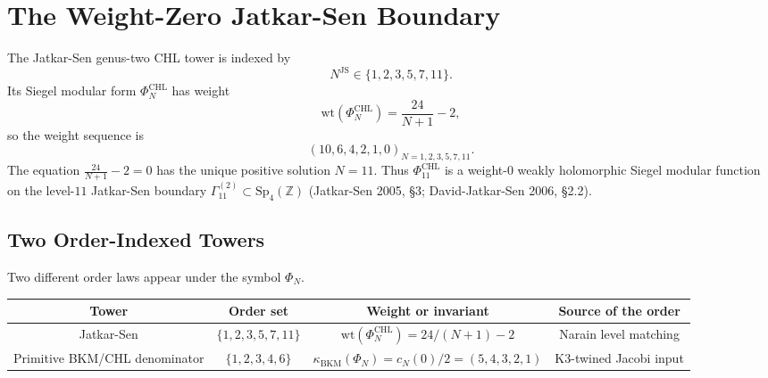 \providecommand{\GSp}{\mathrm{GSp}}
\providecommand{\Sp}{\mathrm{Sp}}
\providecommand{\Mp}{\mathrm{Mp}}
\providecommand{\Oo}{\mathrm{O}}
\providecommand{\PGSp}{\mathrm{PGSp}}
\providecommand{\SL}{\mathrm{SL}}
\providecommand{\A}{\mathbb{A}}
\providecommand{\Q}{\mathbb{Q}}
\providecommand{\Z}{\mathbb{Z}}
\providecommand{\C}{\mathbb{C}}
\providecommand{\BKM}{\mathrm{BKM}}
\providecommand{\Heis}{\mathrm{Heis}}
\providecommand{\VOA}{\mathrm{VOA}}
\providecommand{\kBKM}{\kappa_{\mathrm{BKM}}}
\providecommand{\kch}{\kappa_{\mathrm{ch}}}
\providecommand{\kcat}{\kappa_{\mathrm{cat}}}
\providecommand{\kfib}{\kappa_{\mathrm{fiber}}}
\providecommand{\cA}{\mathcal{A}}
\providecommand{\fh}{\mathfrak{h}}
\providecommand{\fm}{\mathfrak{m}}
\providecommand{\Mwh}{M^{!}}
\providecommand{\PhiCHL}{\Phi^{\mathrm{CHL}}}

\section{The Weight-Zero Jatkar-Sen Boundary}
\label{wn:sec:quadfurcation-cosmo}

The Jatkar-Sen genus-two CHL tower is indexed by
\[
  N^{\mathrm{JS}}\in\{1,2,3,5,7,11\}.
\]
Its Siegel modular form $\PhiCHL_N$ has weight
\[
  \mathrm{wt}(\PhiCHL_N)=\frac{24}{N+1}-2,
\]
so the weight sequence is
\[
  (10,6,4,2,1,0)_{N=1,2,3,5,7,11}.
\]
The equation $\frac{24}{N+1}-2=0$ has the unique positive solution
$N=11$. Thus $\PhiCHL_{11}$ is a weight-$0$ weakly holomorphic Siegel
modular function on the level-$11$ Jatkar-Sen boundary
$\Gamma^{(2)}_{11}\subset\Sp_4(\Z)$ (Jatkar-Sen 2005, \S 3;
David-Jatkar-Sen 2006, \S 2.2).

\subsection{Two Order-Indexed Towers}

Two different order laws appear under the symbol $\Phi_N$.

\begin{center}\small
\renewcommand{\arraystretch}{1.15}
\begin{tabular}{c|c|c|c}
Tower & Order set & Weight or invariant & Source of the order \\
\hline
Jatkar-Sen & $\{1,2,3,5,7,11\}$ &
$\mathrm{wt}(\PhiCHL_N)=24/(N+1)-2$ &
Narain level matching \\
Primitive BKM/CHL denominator & $\{1,2,3,4,6\}$ &
$\kBKM(\Phi_N)=c_N(0)/2=(5,4,3,2,1)$ &
K3-twined Jacobi input \\
\end{tabular}
\end{center}

